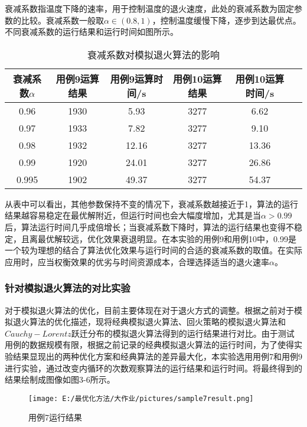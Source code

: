 \documentclass[UTF8]{ctexart}
\begin{document}
衰减系数指温度下降的速率，用于控制温度的退火速度，此处的衰减系数为固定参数的比较。衰减系数一般取\(\alpha \in(0.8,1)\)，控制温度缓慢下降，逐步到达最优点。不同衰减系数的运行结果和运行时间如图所示。
\begin{table} 
	\centering
	\caption{衰减系数对模拟退火算法的影响}
	\begin{tabular}{cccccc} %
		
		\toprule %
衰减系数\(\alpha\) & 用例9运算结果 & 用例9运算时间/s & 用例10运算结果 &
用例10运算时间/s \\
		\hline %
0.96 & 1930 & 5.93 & 3277 & 6.62 \\
0.97 & 1933 & 7.82 & 3277 & 9.10 \\
0.98 & 1932 & 12.16 & 3277 & 13.36 \\
0.99 & 1920 & 24.01 & 3277 & 26.86 \\
0.995 & 1902 & 49.37 & 3277 & 54.37 \\
		\bottomrule %
	\end{tabular}
\end{table}

从表中可以看出，其他参数保持不变的情况下，衰减系数越接近于1，算法的运行结果越容易稳定在最优解附近，但运行时间也会大幅度增加，尤其是当\(\alpha >0.99\)后，算法运行时间几乎成倍增长；当衰减系数下降时，算法的运行结果也变得不稳定，且离最优解较远，优化效果衰退明显。在本实验的用例9和用例10中，0.99是一个较为理想的结合了算法优化效果与运行时间的合适的衰减系数的取值。在实际应用时，应当权衡效果的优劣与时间资源成本，合理选择适当的退火速率\(\alpha\)。

\subsubsection{针对模拟退火算法的对比实验}
对于模拟退火算法的优化，目前主要体现在对于退火方式的调整。根据之前对于模拟退火算法的优化描述，现将经典模拟退火算法、回火策略的模拟退火算法和$Cauchy-Lorentz$跃迁分布的模拟退火算法得到的运行结果进行对比。由于测试用例的数据规模有限，根据之前记录的经典模拟退火算法的运行时间，为了使得实验结果显现出的两种优化方案和经典算法的差异最大化，本实验选用用例7和用例9进行实验，通过改变内循环的次数观察算法的运行结果和运行时间。将最终得到的结果绘制成图像如图3-6所示。

\begin{figure}
	\centering
	\texttt{[image: E:/最优化方法/大作业/pictures/sample7result.png]}
	\caption{用例7运行结果}
\end{figure}
\end{document}
